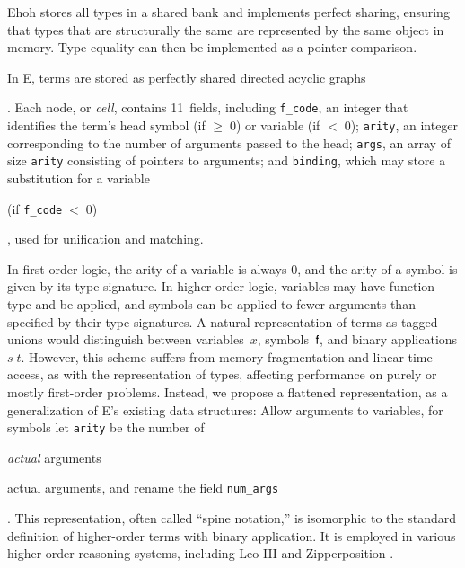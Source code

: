 Ehoh stores all types in a shared bank and
implements perfect sharing, ensuring that types that are structurally the same
are represented by the same object in memory. Type equality can then be
implemented as a pointer comparison.


In E, terms are stored as perfectly shared directed acyclic graphs\begin{rep}
\cite{ls-01-shared}\end{rep}.
%
%
Each node, or \emph{cell}, contains 11~fields, including
\verb|f_code|, an integer that identifies the term's head symbol (if ${\ge}\;0$)
or variable (if ${<}\;0$); \verb|arity|, an integer corresponding to the number
of arguments passed to the head; \verb|args|, an array of size
\verb|arity| consisting of pointers to arguments; and \verb|binding|,
which may store a substitution for a variable\begin{rep} (if
\verb|f_code|$\;{<}\;0$)\end{rep}, used for unification and matching.

In first-order logic, the arity of a variable is always 0, and the arity of a
symbol is given by its type signature.
In higher-order logic, variables may have function type and be applied, and
symbols can be applied to fewer arguments than specified by their type
signatures. A natural representation of \lfhol{} terms as tagged unions
would distinguish between variables~$x$, symbols~$\mathsf{f}$, and binary
applications $s \; t.$ However, this scheme suffers from memory
fragmentation and linear-time access, as with the representation of types,
affecting performance on purely or mostly first-order problems. Instead, we
propose a flattened representation, as a generalization of E's existing data
structures: Allow arguments to variables, for symbols let \verb|arity| be
the number of \begin{conf}\emph{actual} arguments\end{conf}\begin{rep}actual
arguments, %
and rename the field \verb|num_args|\end{rep}. This representation, often called
``spine notation,'' %
is isomorphic to the standard definition of higher-order terms with binary
application. It is employed in various higher-order reasoning systems,
including Leo-III \cite{sb-21-leo3} and
Zipperposition \cite{bbtvw-21-sup-lam}.

